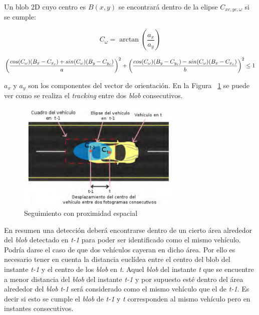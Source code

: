 Un blob 2D cuyo centro es $B(x,y)$ se encontrará dentro de la elipse  $C_{xc,yc,\omega}$ si se cumple:

\begin{equation}\label{ec.blob_elipse}
   C_{\omega} = \arctan(\frac{a_x}{a_y})
\end{equation}

\begin{equation} \scriptsize \label{ec.blob_elipse1}
   \left(\frac{cos(C_\omega)(B_x - C_{x_c}) + sin(C_\omega)(B_y - C_{y_c})}{a} \right)^2 + \left(\frac{cos(C_\omega)(B_y - C_{y_c}) - sin(C_\omega)(B_x - C_{x_c})}{b} \right)^2 \leq 1
\end{equation}

$a_x$ y $a_y$ son los componentes del vector de orientación. En la Figura ~\ref{fig.emparejamiento_blob} se puede ver como se realiza el \textit{tracking} entre dos \textit{blob} consecutivos. 

 \begin{figure}[H] 
\begin{center}
   \includegraphics[width=0.7\textwidth]{figures/Diseno_global/emparejamiento_blob.png}
   \caption{Seguimiento con proximidad espacial}
	\label{fig.emparejamiento_blob}
\end{center}
\end{figure}

En resumen una detección deberá encontrarse dentro de un cierto área alrededor del \textit{blob} detectado en \textit{t-1} para poder ser identificado como el mismo vehículo. Podría darse el caso de que dos vehículos cayeran en dicho área. Por ello es necesario tener en cuenta la distancia euclídea entre el centro del blob del instante \textit{t-1} y el centro de los \textit{blob} en \textit{t}. Aquel \textit{blob} del instante \textit{t} que se encuentre a menor distancia del \textit{blob} del instante \textit{t-1} y por supuesto esté dentro del área alrededor del \textit{blob} \textit{t-1} será considerado como el mismo vehículo que el de \textit{
t-1}. Es decir si esto se cumple el \textit{blob} de \textit{t-1} y \textit{t} corresponden al  mismo vehículo pero en instantes consecutivos.

